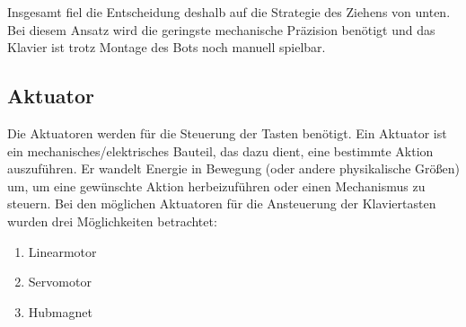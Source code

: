 Insgesamt fiel die Entscheidung deshalb auf die Strategie des Ziehens von unten.
Bei diesem Ansatz wird die geringste mechanische Präzision benötigt und das Klavier ist trotz Montage des Bots noch manuell spielbar.

\subsection{Aktuator}\label{subsec:aktuator}

Die Aktuatoren werden für die Steuerung der Tasten benötigt.
Ein Aktuator ist ein mechanisches/elektrisches Bauteil, das dazu dient,
eine bestimmte Aktion auszuführen.
Er wandelt Energie in Bewegung (oder andere physikalische Größen) um, um eine gewünschte Aktion herbeizuführen
oder einen Mechanismus zu steuern. \newline %
Bei den möglichen Aktuatoren für die Ansteuerung der Klaviertasten wurden drei Möglichkeiten betrachtet: %
\begin{enumerate}
	\item Linearmotor
	\item Servomotor
	\item Hubmagnet
\end{enumerate}

